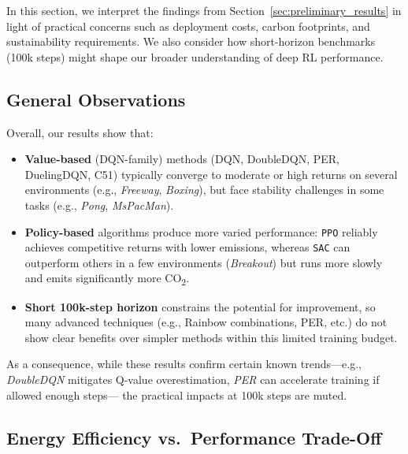 
In this section, we interpret the findings from Section~\ref{sec:preliminary_results} in light of 
practical concerns such as deployment costs, carbon footprints, 
and sustainability requirements. We also consider how short-horizon 
benchmarks (100k steps) might shape our broader understanding of deep RL performance.

\subsection{General Observations}
\label{subsec:general_observations}

Overall, our results show that:
\begin{itemize}
	\item \textbf{Value-based} (DQN-family) methods (DQN, DoubleDQN, PER, DuelingDQN, 
	C51) typically converge to moderate or high returns on several environments 
	(e.g., \emph{Freeway}, \emph{Boxing}), 
	but face stability challenges in some tasks (e.g., \emph{Pong}, \emph{MsPacMan}). 
	\item \textbf{Policy-based} algorithms produce more varied performance: 
	\texttt{PPO} reliably achieves competitive returns with lower emissions, 
	whereas \texttt{SAC} can outperform others in a few environments (\emph{Breakout}) 
	but runs more slowly and emits significantly more CO\textsubscript{2}.
	\item \textbf{Short 100k-step horizon} constrains the potential for improvement, 
	so many advanced techniques (e.g., Rainbow combinations, PER, etc.) 
	do not show clear benefits over simpler methods within this limited training budget.
\end{itemize}

As a consequence, while these results confirm certain known trends—e.g., \emph{DoubleDQN} 
mitigates Q-value overestimation, \emph{PER} can accelerate training if allowed enough steps—
the practical impacts at 100k steps are muted.

\subsection{Energy Efficiency vs.\ Performance Trade-Off}
\label{subsec:energy_vs_perf}

